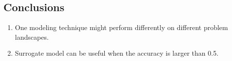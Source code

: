     \subsection{Conclusions}


        \begin{enumerate}
            \item One modeling technique might perform differently on different problem landscapes. \cite{LuST19}
            \item Surrogate model can be useful when the accuracy is larger than 0.5. \cite{LuST19}
        \end{enumerate}
















        


